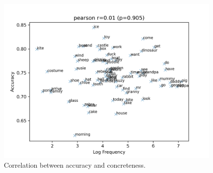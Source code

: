 \begin{figure}
  \centering
  \includegraphics[width=\columnwidth]{results/targeted_triplets/correlation_frequency_acc_version_206980.png}
  \caption{Correlation between accuracy and concreteness.}
  \label{fig:results_correlation_concreteness_acc}
\end{figure}


